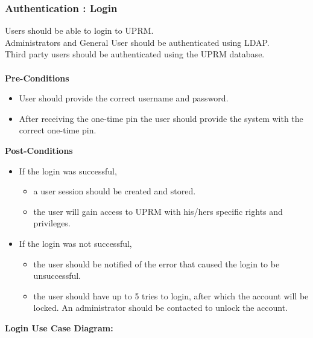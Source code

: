 \subsubsection{Authentication : Login}
Users should be able to login to UPRM.\\
Administrators and General User should be authenticated using LDAP. \\
Third party users should be authenticated using the UPRM database.\\ \\
\textbf{Pre-Conditions}
\begin{itemize}
	\item User should provide the correct username and password.
	\item After receiving the one-time pin the user should provide the system with the correct one-time pin.\\
\end{itemize}
\textbf{Post-Conditions}
\begin{itemize}
	\item If the login was successful,
		\begin{itemize}
			\item a user session should be created and stored.
			\item the user will gain access to UPRM with his/hers specific rights and privileges.
		\end{itemize} 
	\item If the login was not successful,
			\begin{itemize}
				\item the user should be notified of the error that caused the login to be unsuccessful.
				\item the user should have up to 5 tries to login, after which the account will be locked. An administrator should be contacted to unlock the account. \\
			\end{itemize} 
\end{itemize}
\textbf{Login Use Case Diagram:}\\
\centerline{}

\pagebreak
